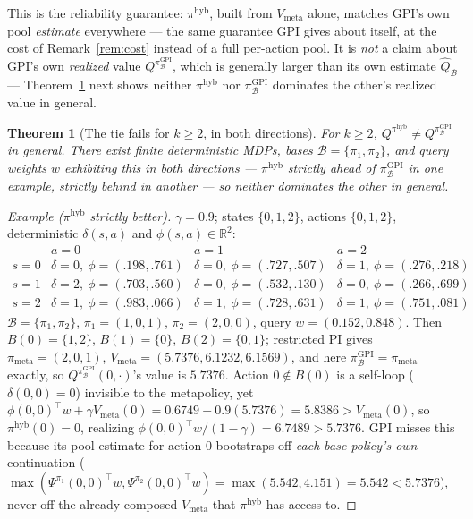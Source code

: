 \documentclass[11pt]{article}
\newtheorem{theorem}{Theorem}
\begin{document}
This is the reliability guarantee: $\pi^{\mathrm{hyb}}$, built from $V_{\mathrm{meta}}$ alone, matches GPI's own pool
\emph{estimate} everywhere — the same guarantee GPI gives about itself, at the cost of Remark~\ref{rem:cost} instead
of a full per-action pool. It is \emph{not} a claim about GPI's own \emph{realized} value
$Q^{\pi^{\mathrm{GPI}}_{\mathcal B}}$, which is generally larger than its own estimate $\widehat Q_{\mathcal B}$ —
Theorem~\ref{thm:tie-fails} next shows neither $\pi^{\mathrm{hyb}}$ nor $\pi^{\mathrm{GPI}}_{\mathcal B}$ dominates the
other's realized value in general.

\begin{theorem}[The tie fails for $k\ge2$, in both directions]\label{thm:tie-fails}
For $k\ge2$, $Q^{\pi^{\mathrm{hyb}}}\ne Q^{\pi^{\mathrm{GPI}}_{\mathcal B}}$ in general. There exist finite
deterministic MDPs, bases $\mathcal B=\{\pi_1,\pi_2\}$, and query weights $w$ exhibiting this in both directions —
$\pi^{\mathrm{hyb}}$ strictly ahead of $\pi^{\mathrm{GPI}}_{\mathcal B}$ in one example, strictly behind in another —
so neither dominates the other in general.
\end{theorem}

\begin{proof}[Example ($\pi^{\mathrm{hyb}}$ strictly better)]
$\gamma=0.9$; states $\{0,1,2\}$, actions $\{0,1,2\}$, deterministic $\delta(s,a)$ and $\phi(s,a)\in\mathbb R^2$:
\[
\begin{array}{c|ccc}
 & a=0 & a=1 & a=2\\\hline
s=0 & \delta{=}0,\ \phi{=}(.198,.761) & \delta{=}0,\ \phi{=}(.727,.507) & \delta{=}1,\ \phi{=}(.276,.218)\\
s=1 & \delta{=}2,\ \phi{=}(.703,.560) & \delta{=}0,\ \phi{=}(.532,.130) & \delta{=}0,\ \phi{=}(.266,.699)\\
s=2 & \delta{=}1,\ \phi{=}(.983,.066) & \delta{=}1,\ \phi{=}(.728,.631) & \delta{=}1,\ \phi{=}(.751,.081)
\end{array}
\]
$\mathcal B=\{\pi_1,\pi_2\}$, $\pi_1=(1,0,1)$, $\pi_2=(2,0,0)$, query $w=(0.152,0.848)$. Then $B(0)=\{1,2\}$,
$B(1)=\{0\}$, $B(2)=\{0,1\}$; restricted PI gives $\pi_{\mathrm{meta}}=(2,0,1)$,
$V_{\mathrm{meta}}=(5.7376,6.1232,6.1569)$, and here $\pi^{\mathrm{GPI}}_{\mathcal B}=\pi_{\mathrm{meta}}$ exactly, so
$Q^{\pi^{\mathrm{GPI}}_{\mathcal B}}(0,\cdot)$'s value is $5.7376$. Action $0\notin B(0)$ is a self-loop
($\delta(0,0)=0$) invisible to the metapolicy, yet $\phi(0,0)^\top w+\gamma V_{\mathrm{meta}}(0) = 0.6749+0.9(5.7376) =
5.8386 > V_{\mathrm{meta}}(0)$, so $\pi^{\mathrm{hyb}}(0)=0$, realizing $\phi(0,0)^\top w/(1-\gamma)=6.7489 > 5.7376$.
GPI misses this because its pool estimate for action $0$ bootstraps off \emph{each base policy's own} continuation
($\max(\Psi^{\pi_1}(0,0)^\top w,\Psi^{\pi_2}(0,0)^\top w)=\max(5.542,4.151)=5.542<5.7376$), never off the
already-composed $V_{\mathrm{meta}}$ that $\pi^{\mathrm{hyb}}$ has access to.
\end{proof}
\end{document}
